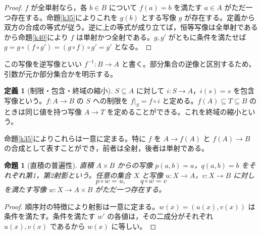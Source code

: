\documentclass[a5paper,10pt,dvipdfmx]{jsarticle}
\theoremstyle{definition}
\newtheorem{defn}[ruledef]{定義}
\theoremstyle{plain}
\newtheorem{prop}[ruledef]{命題}
\begin{document}
\begin{proof}
$f$ が全単射なら，各 $b\in B$ について $f(a)=b$ を満たす $a\in A$ がただ一つ存在する。命題\ref{k35}によりこれを $g(b)$ とする写像 $g$ が存在する。定義から双方の合成の等式が従う。逆に上の等式が成り立てば，恒等写像は全単射であるから命題\ref{k40}により $f$ は単射かつ全射である。$g,g'$ がともに条件を満たせば $g=g\circ(f\circ g')=(g\circ f)\circ g'=g'$ となる。
\end{proof}
この写像を逆写像といい $f^{-1}:B\to A$ と書く。部分集合の逆像と区別するため，引数が元か部分集合かを明示する。
\begin{defn}[制限・包含・終域の縮小]\label{k42}
$S\subseteq A$ に対して $i:S\to A$，$i(s)=s$ を包含写像という。$f:A\to B$ の $S$ への制限を $f|_S=f\circ i$ と定める。$f(A)\subseteq T\subseteq B$ のときは同じ値を持つ写像 $A\to T$ を定めることができる。これを終域の縮小という。
\end{defn}
命題\ref{k35}によりこれらは一意に定まる。特に $f$ を $A\to f(A)$ と $f(A)\to B$ の合成として表すことができ，前者は全射，後者は単射である。
\begin{prop}[直積の普遍性]\label{k43}
直積 $A\times B$ からの写像 $p(a,b)=a$，$q(a,b)=b$ をそれぞれ第1，第2射影という。任意の集合 $X$ と写像 $u:X\to A$，$v:X\to B$ に対し
\[
 p\circ w=u,\qquad q\circ w=v
\]
を満たす写像 $w:X\to A\times B$ がただ一つ存在する。
\end{prop}
\begin{proof}
順序対の特徴により射影は一意に定まる。$w(x)=(u(x),v(x))$ は条件を満たす。条件を満たす $w'$ の各値は，その二成分がそれぞれ $u(x),v(x)$ であるから $w(x)$ に等しい。
\end{proof}
\end{document}
